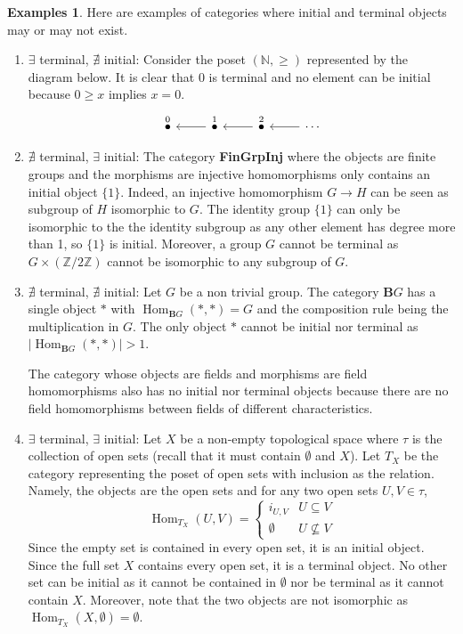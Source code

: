 \documentclass{article}
\theoremstyle{definition}
\newtheorem{exmps}[thm]{Examples}
\theoremstyle{remark}
\newcommand{\N}{\mathbb{N}}
\newcommand{\Z}{\mathbb{Z}}
\DeclareMathOperator{\Hom}{Hom}
\begin{document}
\begin{exmps}
	Here are examples of categories where initial and terminal objects may or may not exist.
	\begin{enumerate}
		\item $\exists$ terminal, $\nexists$ initial: Consider the poset $(\N, \geq)$ represented by the diagram below. It is clear that $0$ is terminal and no element can be initial because $0 \geq x$ implies $x = 0$.
		\begin{equation}
			\begin{tikzcd}
			\stackrel{0}{\bullet}  & \arrow[l] \stackrel{1}{\bullet}  & \arrow[l] \stackrel{2}{\bullet}  & \arrow[l] \cdots
			\end{tikzcd}
		\end{equation}
		\item %
		$\nexists$ terminal, $\exists$ initial: The category \textbf{FinGrpInj} where the objects are finite groups and the morphisms are injective homomorphisms only contains an initial object $\{1\}$. Indeed, an injective homomorphism $G \rightarrow H$ can be seen as subgroup of $H$ isomorphic to $G$. The identity group $\{1\}$ can only be isomorphic to the the identity subgroup as any other element has degree more than 1, so $\{1\}$ is initial. Moreover, a group $G$ cannot be terminal as $G \times (\Z/2\Z)$ cannot be isomorphic to any subgroup of $G$.
		\item $\nexists$ terminal, $\nexists$ initial: Let $G$ be a non trivial group. The category $\mathbf{B}G$ has a single object $*$ with $\Hom_{\mathbf{B}G}(*, *) = G$ and the composition rule being the multiplication in $G$. The only object $*$ cannot be initial nor terminal as $|\Hom_{\mathbf{B}G}(*,*)| > 1$.
		
		The category whose objects are fields and morphisms are field homomorphisms also has no initial nor terminal objects because there are no field homomorphisms between fields of different characteristics.
		\item $\exists$ terminal, $\exists$ initial: Let $X$ be a non-empty topological space where $\tau$ is the collection of open sets (recall that it must contain $\emptyset$ and $X$). Let $T_X$ be the category representing the poset of open sets with inclusion as the relation. Namely, the objects are the open sets and for any two open sets $U, V \in \tau$, 
		\[\Hom_{T_X}(U,V) = \begin{cases}i_{U,V} & U \subseteq V\\ \emptyset & U \not\subseteq V\end{cases}\]
		Since the empty set is contained in every open set, it is an initial object. Since the full set $X$ contains every open set, it is a terminal object. No other set can be initial as it cannot be contained in $\emptyset$ nor be terminal as it cannot contain $X$. Moreover, note that the two objects are  not isomorphic as $\Hom_{T_X}(X, \emptyset) = \emptyset$.
	\end{enumerate}
\end{exmps}
\end{document}
